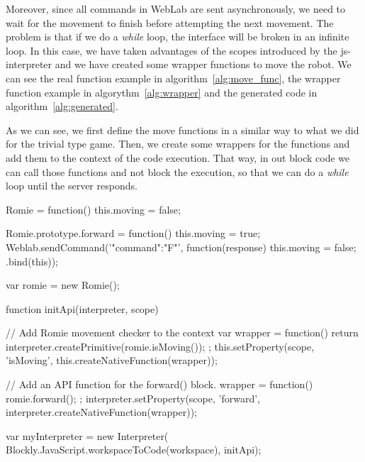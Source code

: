 Moreover, since all commands in WebLab are sent asynchronously, we need to wait for the movement to
finish before attempting the next movement. The problem is that if we do a \emph{while} loop, the
interface will be broken in an infinite loop. In this case, we have taken advantages of the scopes
introduced by the \acrshort{js}-interpreter and we have created some wrapper functions to move the
robot. We can see the real function example in algorithm~\ref{alg:move_func}, the wrapper function
example in algorythm~\ref{alg:wrapper} and the generated code in algorithm~\ref{alg:generated}.

As we can see, we first define the move functions in a similar way to what we did for the trivial
type game. Then, we create some wrappers for the functions and add them to the context of the code
execution. That way, in out block code we can call those functions and not block the execution, so
that we can do a \emph{while} loop until the server responds.

\begin{center}
\begin{minipage}{.9\textwidth}
\singlespace
{}
\begin{pyglist}[language=javascript, caption={Robot movement function.},
	label={alg:move_func}, listingname={Algorithm}, numbers=left]
Romie = function() {
    this.moving = false;
}

Romie.prototype.forward = function() {
    this.moving = true;
    Weblab.sendCommand('{"command":"F"}', function(response) {
        this.moving = false;
    }.bind(this));
}

var romie = new Romie();
\end{pyglist}
\end{minipage}
\end{center}

\begin{center}
\begin{minipage}{.9\textwidth}
\singlespace
{}
\begin{pyglist}[language=javascript, caption={Function wrapper.},
	label={alg:wrapper}, listingname={Algorithm}, numbers=left]
function initApi(interpreter, scope) {
	// Add Romie movement checker to the context
	var wrapper = function() {
		return interpreter.createPrimitive(romie.isMoving());
	};
	this.setProperty(scope, 'isMoving',
		this.createNativeFunction(wrapper));

	// Add an API function for the forward() block.
	wrapper = function() {
		romie.forward();
	};
	interpreter.setProperty(scope, 'forward',
		interpreter.createNativeFunction(wrapper));
}
var myInterpreter = new Interpreter(
	Blockly.JavaScript.workspaceToCode(workspace),
	initApi);
\end{pyglist}
\end{minipage}
\end{center}

